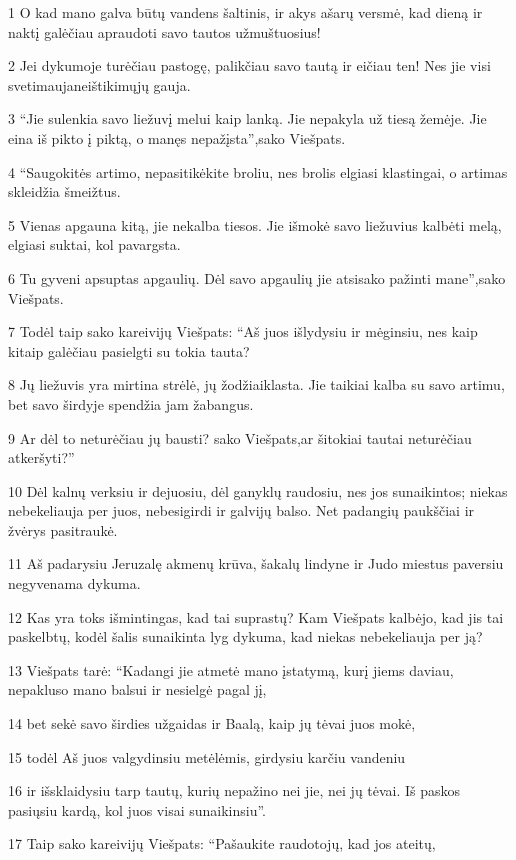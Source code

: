 \par 1 O kad mano galva būtų vandens šaltinis, ir akys ašarų versmė, kad dieną ir naktį galėčiau apraudoti savo tautos užmuštuosius! 
\par 2 Jei dykumoje turėčiau pastogę, palikčiau savo tautą ir eičiau ten! Nes jie visi svetimauja­neištikimųjų gauja. 
\par 3 “Jie sulenkia savo liežuvį melui kaip lanką. Jie nepakyla už tiesą žemėje. Jie eina iš pikto į piktą, o manęs nepažįsta”,­sako Viešpats. 
\par 4 “Saugokitės artimo, nepasitikėkite broliu, nes brolis elgiasi klastingai, o artimas skleidžia šmeižtus. 
\par 5 Vienas apgauna kitą, jie nekalba tiesos. Jie išmokė savo liežuvius kalbėti melą, elgiasi suktai, kol pavargsta. 
\par 6 Tu gyveni apsuptas apgaulių. Dėl savo apgaulių jie atsisako pažinti mane”,­sako Viešpats. 
\par 7 Todėl taip sako kareivijų Viešpats: “Aš juos išlydysiu ir mėginsiu, nes kaip kitaip galėčiau pasielgti su tokia tauta? 
\par 8 Jų liežuvis yra mirtina strėlė, jų žodžiai­klasta. Jie taikiai kalba su savo artimu, bet savo širdyje spendžia jam žabangus. 
\par 9 Ar dėl to neturėčiau jų bausti?­ sako Viešpats,­ar šitokiai tautai neturėčiau atkeršyti?” 
\par 10 Dėl kalnų verksiu ir dejuosiu, dėl ganyklų raudosiu, nes jos sunaikintos; niekas nebekeliauja per juos, nebesigirdi ir galvijų balso. Net padangių paukščiai ir žvėrys pasitraukė. 
\par 11 Aš padarysiu Jeruzalę akmenų krūva, šakalų lindyne ir Judo miestus paversiu negyvenama dykuma. 
\par 12 Kas yra toks išmintingas, kad tai suprastų? Kam Viešpats kalbėjo, kad jis tai paskelbtų, kodėl šalis sunaikinta lyg dykuma, kad niekas nebekeliauja per ją? 
\par 13 Viešpats tarė: “Kadangi jie atmetė mano įstatymą, kurį jiems daviau, nepakluso mano balsui ir nesielgė pagal jį, 
\par 14 bet sekė savo širdies užgaidas ir Baalą, kaip jų tėvai juos mokė, 
\par 15 todėl Aš juos valgydinsiu metėlėmis, girdysiu karčiu vandeniu 
\par 16 ir išsklaidysiu tarp tautų, kurių nepažino nei jie, nei jų tėvai. Iš paskos pasiųsiu kardą, kol juos visai sunaikinsiu”. 
\par 17 Taip sako kareivijų Viešpats: “Pašaukite raudotojų, kad jos ateitų, 
